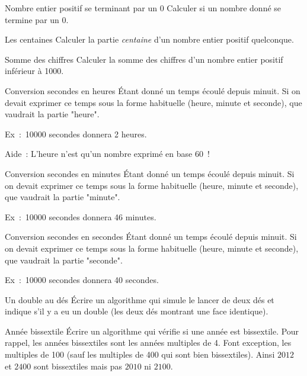 			\begin{Exercice}{Nombre entier positif se terminant par un 0}
				Calculer si un nombre donné se termine par un 0.
			\end{Exercice}
	
			\begin{Exercice}{Les centaines}
				Calculer la partie \emph{centaine}
				d’un nombre entier positif quelconque.
			\end{Exercice}
	
			\begin{Exercice}{Somme des chiffres}
				Calculer la somme des chiffres
				d’un nombre entier positif inférieur à 1000.
			\end{Exercice}
		
			\begin{Exercice}{Conversion secondes en heures}
				Étant donné un temps écoulé depuis minuit.
				Si on devait exprimer ce temps sous la forme
				habituelle (heure, minute et seconde),
				que vaudrait la partie "heure".
		
				Ex~:~10000 secondes donnera 2 heures.
				
				Aide~: L’heure n’est qu’un nombre exprimé en base 60~!
			\end{Exercice}
		
			\begin{Exercice}{Conversion secondes en minutes}
				Étant donné un temps écoulé depuis minuit.
				Si on devait exprimer ce temps sous la forme
				habituelle (heure, minute et seconde),
				que vaudrait la partie "minute".
		
				Ex~:~10000 secondes donnera 46 minutes.
			\end{Exercice}
		
			\begin{Exercice}{Conversion secondes en secondes}
				Étant donné un temps écoulé depuis minuit.
				Si on devait exprimer ce temps sous la forme
				habituelle (heure, minute et seconde),
				que vaudrait la partie "seconde".
		
				Ex~:~10000 secondes donnera 40 secondes.
			\end{Exercice}	

			\begin{Exercice}{Un double au dés}
				Écrire un algorithme qui simule le lancer de deux dés
				et indique s’il y a eu un double 
				(les deux dés montrant une face identique).
			\end{Exercice}
		
			\begin{Exercice}{Année bissextile}
				\label{ex:bissextile}
				Écrire un algorithme qui vérifie si une année est bissextile. 
				Pour rappel, les années bissextiles sont les années multiples de 4. 
				Font exception, les multiples de 100 
				(sauf les multiples de 400 qui sont bien bissextiles). 
				Ainsi $2012$ et $2400$ sont bissextiles mais pas $2010$ ni $2100$.
			\end{Exercice}
			 		 

